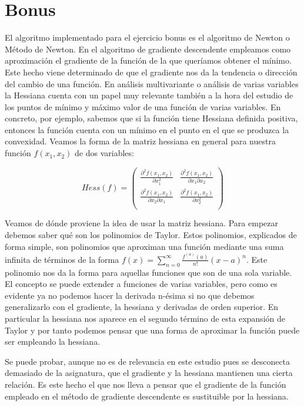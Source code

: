 \documentclass[12pt,a4paper]{article}
\begin{document}
\section{Bonus}
El algoritmo implementado para el ejercicio bonus es el algoritmo de Newton o Método de Newton. En el algoritmo de gradiente descendente empleamos como aproximación el gradiente de la función de la que queríamos obtener el mínimo. Este hecho viene determinado de que el gradiente nos da la tendencia o dirección del cambio de una función. En análisis multivariante o análisis de varias variables la Hessiana cuenta con un papel muy relevante también a la hora del estudio de los puntos de mínimo y máximo valor de una función de varias variables. En concreto, por ejemplo, sabemos que si la función tiene Hessiana definida positiva, entonces la función cuenta con un mínimo en el punto en el que se produzca la convexidad. Veamos la forma de la matriz hessiana en general para nuestra función $f(x_1,x_2)$ de dos variables:

$$Hess(f) = \begin{pmatrix}
\frac{\partial^2 f(x_1,x_2)}{\partial x_{1}^{2}} & \frac{\partial^2 f(x_1,x_2)}{\partial x_1 \partial x_2} \\
\frac{\partial^2 f(x_1,x_2)}{\partial x_2 \partial x_1} & \frac{\partial^2 f(x_1,x_2)}{\partial x_{2}^{2}} \\
\end{pmatrix}$$

Veamos de dónde proviene la idea de usar la matriz hessiana. Para empezar debemos saber qué son los polinomios de Taylor. Estos polinomios, explicados de forma simple, son polinomios que aproximan una función mediante una suma infinita de términos de la forma $f(x) = \sum_{n=0}^{\infty}\frac{f^{(n)}(a)}{n!}(x-a)^n$. Este polinomio nos da la forma para aquellas funciones que son de una sola variable. El concepto se puede extender a funciones de varias variables, pero como es evidente ya no podemos hacer la derivada n-ésima si no que debemos generalizarlo con el gradiente, la hessiana y derivadas de orden superior. En particular la hessiana nos aparece en el segundo término de esta expansión de Taylor y por tanto podemos pensar que una forma de aproximar la función puede ser empleando la hessiana.

Se puede probar, aunque no es de relevancia en este estudio pues se desconecta demasiado de la asignatura, que el gradiente y la hessiana mantienen una cierta relación. Es este hecho el que nos lleva a pensar que el gradiente de la función empleado en el método de gradiente descendente es sustituible por la hessiana.
\end{document}
